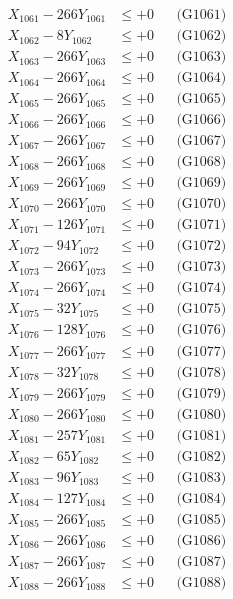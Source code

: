 \documentclass[a4paper,10pt]{article}
\begin{document}
{\begin{align}
\allowbreak
X_{1061} - 266Y_{1061} &\leq +0 && \text{(G1061)} \\
X_{1062} - 8Y_{1062} &\leq +0 && \text{(G1062)} \\
X_{1063} - 266Y_{1063} &\leq +0 && \text{(G1063)} \\
X_{1064} - 266Y_{1064} &\leq +0 && \text{(G1064)} \\
X_{1065} - 266Y_{1065} &\leq +0 && \text{(G1065)} \\
X_{1066} - 266Y_{1066} &\leq +0 && \text{(G1066)} \\
X_{1067} - 266Y_{1067} &\leq +0 && \text{(G1067)} \\
X_{1068} - 266Y_{1068} &\leq +0 && \text{(G1068)} \\
X_{1069} - 266Y_{1069} &\leq +0 && \text{(G1069)} \\
X_{1070} - 266Y_{1070} &\leq +0 && \text{(G1070)} \\
\allowbreak
X_{1071} - 126Y_{1071} &\leq +0 && \text{(G1071)} \\
X_{1072} - 94Y_{1072} &\leq +0 && \text{(G1072)} \\
X_{1073} - 266Y_{1073} &\leq +0 && \text{(G1073)} \\
X_{1074} - 266Y_{1074} &\leq +0 && \text{(G1074)} \\
X_{1075} - 32Y_{1075} &\leq +0 && \text{(G1075)} \\
X_{1076} - 128Y_{1076} &\leq +0 && \text{(G1076)} \\
X_{1077} - 266Y_{1077} &\leq +0 && \text{(G1077)} \\
X_{1078} - 32Y_{1078} &\leq +0 && \text{(G1078)} \\
X_{1079} - 266Y_{1079} &\leq +0 && \text{(G1079)} \\
X_{1080} - 266Y_{1080} &\leq +0 && \text{(G1080)} \\
\allowbreak
X_{1081} - 257Y_{1081} &\leq +0 && \text{(G1081)} \\
X_{1082} - 65Y_{1082} &\leq +0 && \text{(G1082)} \\
X_{1083} - 96Y_{1083} &\leq +0 && \text{(G1083)} \\
X_{1084} - 127Y_{1084} &\leq +0 && \text{(G1084)} \\
X_{1085} - 266Y_{1085} &\leq +0 && \text{(G1085)} \\
X_{1086} - 266Y_{1086} &\leq +0 && \text{(G1086)} \\
X_{1087} - 266Y_{1087} &\leq +0 && \text{(G1087)} \\
X_{1088} - 266Y_{1088} &\leq +0 && \text{(G1088)} \\

\end{align}}
\end{document}
